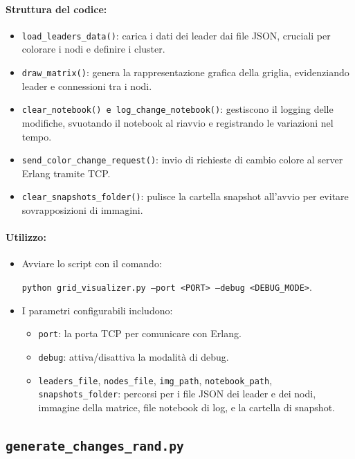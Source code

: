 \documentclass[12pt, a4paper]{report}
\begin{document}
\paragraph{Struttura del codice:}
\begin{itemize}
    \item \texttt{load\_leaders\_data()}: carica i dati dei leader dai file JSON, cruciali per colorare i nodi e definire i cluster.
    \item \texttt{draw\_matrix()}: genera la rappresentazione grafica della griglia, evidenziando leader e connessioni tra i nodi.
    \item \texttt{clear\_notebook() e log\_change\_notebook()}: gestiscono il logging delle modifiche, svuotando il notebook al riavvio e registrando le variazioni nel tempo.
    \item \texttt{send\_color\_change\_request()}: invio di richieste di cambio colore al server Erlang tramite TCP.
    \item \texttt{clear\_snapshots\_folder()}: pulisce la cartella snapshot all’avvio per evitare sovrapposizioni di immagini.
\end{itemize}

\paragraph{Utilizzo:}
\begin{itemize}
    \item Avviare lo script con il comando:

      \hspace{20pt}\texttt{python grid\_visualizer.py --port <PORT> --debug <DEBUG\_MODE>}.
    \item I parametri configurabili includono: 
    \begin{itemize}
        \item \texttt{port}: la porta TCP per comunicare con Erlang.
        \item \texttt{debug}: attiva/disattiva la modalità di debug.
        \item \texttt{leaders\_file}, \texttt{nodes\_file}, \texttt{img\_path}, \texttt{notebook\_path}, \texttt{snapshots\_folder}: percorsi per i file JSON dei leader e dei nodi, immagine della matrice, file notebook di log, e la cartella di snapshot.
    \end{itemize}
\end{itemize}

\subsection{\texttt{generate\_changes\_rand.py}}\label{sec:random_changes}
\end{document}
